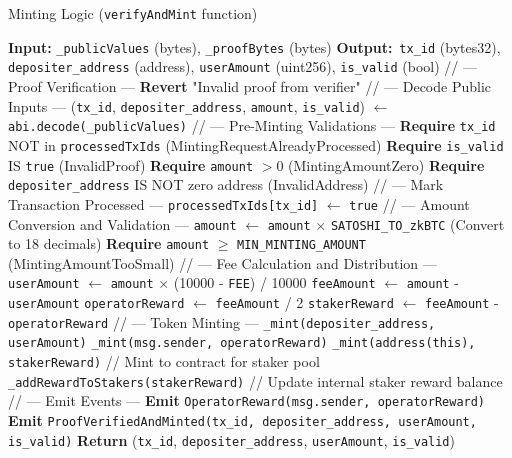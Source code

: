 \documentclass{DESSThesis}
\newcommand{\zktoken}{\texttt{zkBTC}}
\begin{document}
\begin{algorithm}
\caption{Minting Logic (\texttt{verifyAndMint} function)}
\label{alg:minting_logic}
\begin{algorithmic}[1] %
        \State \textbf{Input:} \texttt{\_publicValues} (bytes), \texttt{\_proofBytes} (bytes)
        \State \textbf{Output:}\allowbreak\ \texttt{tx\_id} (bytes32), \texttt{depositer\_address} (address), \texttt{userAmount} (uint256), \texttt{is\_valid} (bool)
        \State
        \State // --- Proof Verification ---
            \State \textbf{Revert} "Invalid proof from verifier"
        \EndIf
        \State
        \State // --- Decode Public Inputs ---
        \State (\texttt{tx\_id}, \texttt{depositer\_address}, \texttt{amount}, \texttt{is\_valid}) $\gets$ \texttt{abi.decode(\_publicValues)}
        \State
        \State // --- Pre-Minting Validations ---
        \State \textbf{Require} \texttt{tx\_id} NOT in \texttt{processedTxIds} (MintingRequestAlreadyProcessed)
        \State \textbf{Require} \texttt{is\_valid} IS \texttt{true} (InvalidProof)
        \State \textbf{Require} \texttt{amount} $> 0$ (MintingAmountZero)
        \State \textbf{Require} \texttt{depositer\_address} IS NOT zero address (InvalidAddress)
        \State
        \State // --- Mark Transaction Processed ---
        \State \texttt{processedTxIds[tx\_id]} $\gets$ \texttt{true}
        \State
        \State // --- Amount Conversion and Validation ---
        \State \texttt{amount} $\gets$ \texttt{amount} $\times$ \texttt{SATOSHI\_TO\_\zktoken} (Convert to 18 decimals)
        \State \textbf{Require} \texttt{amount} $\ge$ \texttt{MIN\_MINTING\_AMOUNT} (MintingAmountTooSmall)
        \State
        \State // --- Fee Calculation and Distribution ---
        \State \texttt{userAmount} $\gets$ \texttt{amount} $\times$ (10000 - \texttt{FEE}) / 10000
        \State \texttt{feeAmount} $\gets$ \texttt{amount} - \texttt{userAmount}
        \State \texttt{operatorReward} $\gets$ \texttt{feeAmount} / 2
        \State \texttt{stakerReward} $\gets$ \texttt{feeAmount} - \texttt{operatorReward}
        \State
        \State // --- Token Minting ---
        \State \texttt{\_mint(depositer\_address, userAmount)}
        \State \texttt{\_mint(msg.sender, operatorReward)}
        \State \texttt{\_mint(address(this), stakerReward)} // Mint to contract for staker pool
        \State \texttt{\_addRewardToStakers(stakerReward)} // Update internal staker reward balance
        \State
        \State // --- Emit Events ---
        \State \textbf{Emit} \texttt{OperatorReward(msg.sender, operatorReward)}
        \State \textbf{Emit} \texttt{ProofVerifiedAndMinted(tx\_id, depositer\_address, userAmount, is\_valid)}
        \State
        \State \textbf{Return} (\texttt{tx\_id}, \texttt{depositer\_address}, \texttt{userAmount}, \texttt{is\_valid})
    \EndProcedure
\end{algorithmic}
\end{algorithm}
\end{document}

